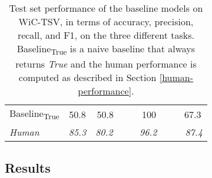 \documentclass[11pt,a4paper]{article}
\begin{document}
\begin{table}
{{\begin{tabular}{ll cc}
\midrule

\multicolumn{2}{l}{Baseline\textsubscript{True}}   &   50.8   &   50.8~~~~~~100~~~~~~67.3	\\
\it Human   & &  \textit{85.3}   &   \textit{80.2}~~~~~ \textit{96.2}~~~~~~\textit{87.4}	\\

\bottomrule
\end{tabular}
}
}
\caption{\label{tab:results_task_all}
Test set performance of the baseline models on WiC-TSV, in terms of accuracy, precision, recall, and F1, on the three different tasks.
Baseline\textsubscript{True} is a naive baseline that always returns \textit{True} and the human performance is computed as described in Section \ref{human-performance}.
} 
\end{table}


\subsection{Results}
\label{results}
\end{document}
